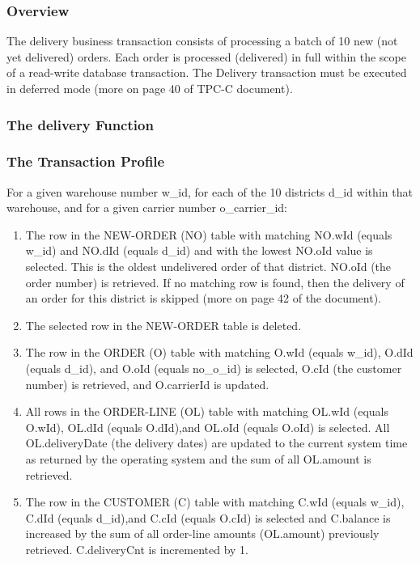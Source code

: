 \subsubsection {Overview}

The delivery business transaction consists of processing a batch of 10 new (not yet delivered) orders. Each order is processed (delivered) in full within the scope of a read-write database transaction. The Delivery transaction must be executed in deferred mode (more on page 40 of TPC-C document).

\subsubsection{The delivery Function}



\subsubsection{The Transaction Profile}

For a given warehouse number w\_id, for each of the 10 districts d\_id within that warehouse, and for a given carrier number o\_carrier\_id: 

\begin{enumerate}
    \item The row in the NEW-ORDER (NO) table with matching NO.wId (equals w\_id) and NO.dId (equals d\_id) and with the lowest NO.oId value is selected. This is the oldest undelivered order of that district. NO.oId (the order number) is retrieved. If no matching row is found, then the delivery of an order for this district is skipped (more on page 42 of the document).
    
    \item The selected row in the NEW-ORDER table is deleted.
    
    \item The row in the ORDER (O) table with matching O.wId (equals w\_id), O.dId (equals d\_id), and O.oId (equals no\_o\_id) is selected, O.cId (the customer number) is retrieved, and O.carrierId is updated.
    
    \item All rows in the ORDER-LINE (OL) table with matching OL.wId (equals O.wId), OL.dId (equals O.dId),and OL.oId (equals O.oId) is selected. All OL.deliveryDate (the delivery dates) are updated to the current system time as returned by the operating system and the sum of all OL.amount is retrieved.
    
    \item The row in the CUSTOMER (C) table with matching C.wId (equals w\_id), C.dId (equals d\_id),and C.cId (equals O.cId) is selected and C.balance is increased by the sum of all order-line amounts (OL.amount) previously retrieved. C.deliveryCnt is incremented by 1. 
    
\end{enumerate}
